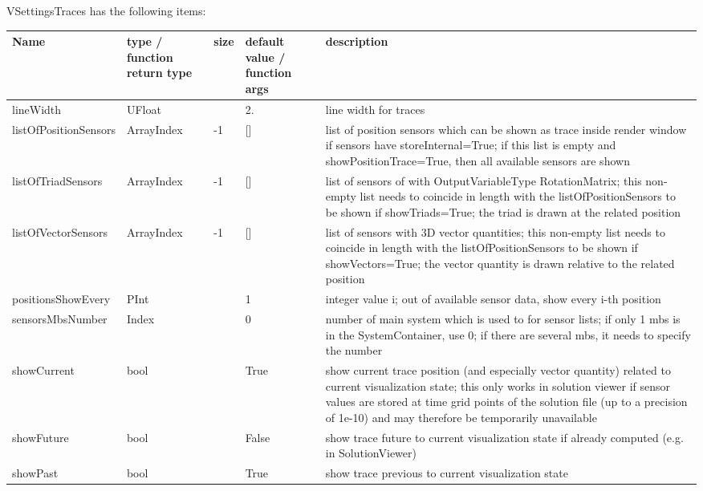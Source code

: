 \noindent VSettingsTraces has the following items:
\begin{center}
  \footnotesize
  \begin{longtable}{| p{4.2cm} | p{2.5cm} | p{0.3cm} | p{3.0cm} | p{6cm} |}
    \hline
    \bf Name & \bf type / function return type & \bf size & \bf default value / function args & \bf description \\ \hline
    lineWidth &     UFloat &      &     2. &     line width for traces\\ \hline
    listOfPositionSensors &     ArrayIndex &     -1 &     [] &     list of position sensors which can be shown as trace inside render window if sensors have storeInternal=True; if this list is empty and showPositionTrace=True, then all available sensors are shown\\ \hline
    listOfTriadSensors &     ArrayIndex &     -1 &     [] &     list of sensors of with OutputVariableType RotationMatrix; this non-empty list needs to coincide in length with the listOfPositionSensors to be shown if showTriads=True; the triad is drawn at the related position\\ \hline
    listOfVectorSensors &     ArrayIndex &     -1 &     [] &     list of sensors with 3D vector quantities; this non-empty list needs to coincide in length with the listOfPositionSensors to be shown if showVectors=True; the vector quantity is drawn relative to the related position\\ \hline
    positionsShowEvery &     PInt &      &     1 &     integer value i; out of available sensor data, show every i-th position\\ \hline
    sensorsMbsNumber &     Index &      &     0 &     number of main system which is used to for sensor lists; if only 1 mbs is in the SystemContainer, use 0; if there are several mbs, it needs to specify the number\\ \hline
    showCurrent &     bool &      &     True &     show current trace position (and especially vector quantity) related to current visualization state; this only works in solution viewer if sensor values are stored at time grid points of the solution file (up to a precision of 1e-10) and may therefore be temporarily unavailable\\ \hline
    showFuture &     bool &      &     False &     show trace future to current visualization state if already computed (e.g. in SolutionViewer)\\ \hline
    showPast &     bool &      &     True &     show trace previous to current visualization state\\ \hline

\end{longtable}
\end{center}
